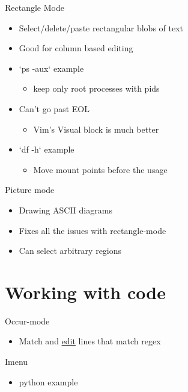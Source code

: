 \documentclass[bigger]{beamer}
\begin{document}
\begin{frame}[label=sec-5-2]{Rectangle Mode}
\begin{itemize}
\item Select/delete/paste rectangular blobs of text
\item Good for column based editing
\item `ps -aux` example
\begin{itemize}
\item keep only root processes with pids
\end{itemize}
\item Can't go past EOL
\begin{itemize}
\item Vim's Visual block is much better
\end{itemize}
\item `df -h` example
\begin{itemize}
\item Move mount points before the usage
\end{itemize}
\end{itemize}
\end{frame}

\begin{frame}[label=sec-5-3]{Picture mode}
\begin{itemize}
\item Drawing ASCII diagrams
\item Fixes all the issues with rectangle-mode
\item Can select arbitrary regions
\end{itemize}
\end{frame}

\section{Working with code}
\label{sec-6}
\begin{frame}[label=sec-6-1]{Occur-mode}
\begin{itemize}
\item Match and \uline{edit} lines that match regex
\end{itemize}
\end{frame}

\begin{frame}[label=sec-6-2]{Imenu}
\begin{itemize}
\item python example
\end{itemize}
\end{frame}
\end{document}
